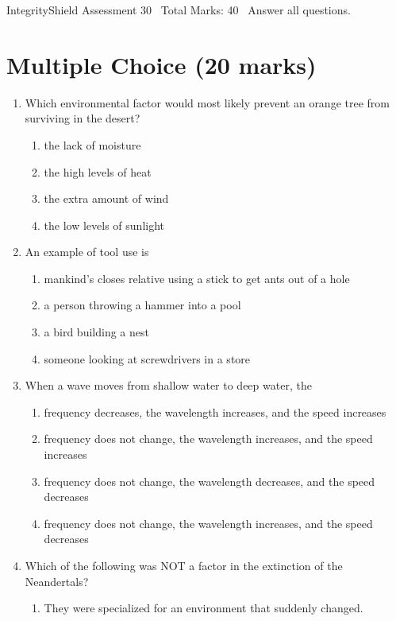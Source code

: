\documentclass[12pt]{article}
\begin{document}
\begin{center}
IntegrityShield Assessment 30 \
Total Marks: 40 \
Answer all questions.
\end{center}

\section*{Multiple Choice (20 marks)}
\begin{enumerate}[label=\arabic*.]
\item Which environmental factor would most likely prevent an orange tree from surviving in the desert?
\begin{enumerate}[label=(\alph*)]
    \item the lack of moisture
    \item the high levels of heat
    \item the extra amount of wind
    \item the low levels of sunlight
\end{enumerate}
\item An example of tool use is
\begin{enumerate}[label=(\alph*)]
    \item mankind's closes relative using a stick to get ants out of a hole
    \item a person throwing a hammer into a pool
    \item a bird building a nest
    \item someone looking at screwdrivers in a store
\end{enumerate}
\item When a wave moves from shallow water to deep water, the
\begin{enumerate}[label=(\alph*)]
    \item frequency decreases, the wavelength increases, and the speed increases
    \item frequency does not change, the wavelength increases, and the speed increases
    \item frequency does not change, the wavelength decreases, and the speed decreases
    \item frequency does not change, the wavelength increases, and the speed decreases
\end{enumerate}
\item Which of the following was NOT a factor in the extinction of the Neandertals?
\begin{enumerate}[label=(\alph*)]
    \item They were specialized for an environment that suddenly changed.

\end{enumerate}
\end{enumerate}
\end{document}
